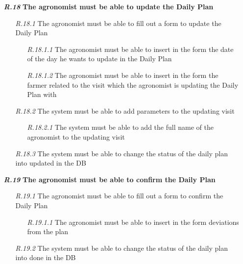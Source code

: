 \begin{itemize}
        \item [\textbf{\textit{R.18}}] \textbf{The agronomist must be able to update the Daily Plan}
        \begin{itemize}
            \item [\textit{R.18.1}] The agronomist must be able to fill out a form to update the Daily Plan
            \begin{itemize}
                \item [\textit{R.18.1.1}] The agronomist must be able to insert in the form the date of the day he wants to update in the Daily Plan
		        \item [\textit{R.18.1.2}] The agronomist must be able to insert in the form the farmer related to the visit which the agronomist is updating the Daily Plan with
            \end{itemize}
            \item [\textit{R.18.2}] The system must be able to add parameters to the updating visit
            \begin{itemize}
                \item [\textit{R.18.2.1}] The system must be able to add the full name of the agronomist to the updating visit
            \end{itemize}
            \item [\textit{R.18.3}] The system must be able to change the status of the daily plan into updated in the DB
        \end{itemize}
		
        \item [\textbf{\textit{R.19}}] \textbf{The agronomist must be able to confirm the Daily Plan}
        \begin{itemize}
            \item [\textit{R.19.1}] The agronomist must be able to fill out a form to confirm the Daily Plan
            \begin{itemize}
                \item [\textit{R.19.1.1}] The agronomist must be able to insert in the form deviations from the plan
            \end{itemize}
            \item [\textit{R.19.2}] The system must be able to change the status of the daily plan into done in the DB
        \end{itemize}


\end{itemize}
